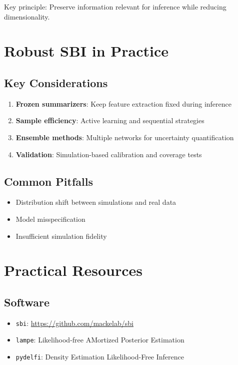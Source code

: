 \documentclass[11pt,a4paper]{article}
\theoremstyle{definition}
\begin{document}
Key principle: Preserve information relevant for inference while reducing dimensionality.

\section{Robust SBI in Practice}

\subsection{Key Considerations}
\begin{enumerate}
    \item \textbf{Frozen summarizers}: Keep feature extraction fixed during inference
    \item \textbf{Sample efficiency}: Active learning and sequential strategies
    \item \textbf{Ensemble methods}: Multiple networks for uncertainty quantification
    \item \textbf{Validation}: Simulation-based calibration and coverage tests
\end{enumerate}

\subsection{Common Pitfalls}
\begin{itemize}
    \item Distribution shift between simulations and real data
    \item Model misspecification
    \item Insufficient simulation fidelity
\end{itemize}

\section{Practical Resources}

\subsection{Software}
\begin{itemize}
    \item \texttt{sbi}: \url{https://github.com/mackelab/sbi}
    \item \texttt{lampe}: Likelihood-free AMortized Posterior Estimation
    \item \texttt{pydelfi}: Density Estimation Likelihood-Free Inference
\end{itemize}
\end{document}
